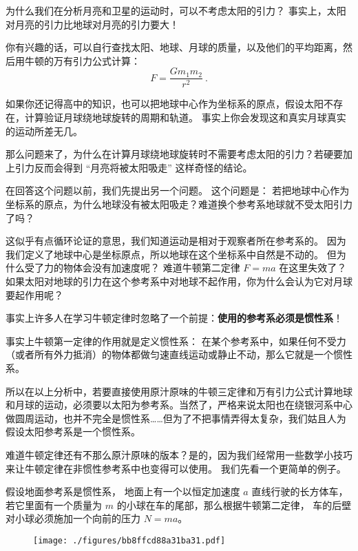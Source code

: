 
为什么我们在分析月亮和卫星的运动时，可以不考虑太阳的引力？ 事实上，太阳对月亮的引力比地球对月亮的引力要大！

你有兴趣的话，可以自行查找太阳、地球、月球的质量，以及他们的平均距离，然后用牛顿的万有引力公式计算：
\begin{equation}
F = \frac{Gm_1m_2}{r^2}~.
\end{equation}

如果你还记得高中的知识，也可以把地球中心作为坐标系的原点，假设太阳不存在，计算验证月球绕地球旋转的周期和轨道。 事实上你会发现这和真实月球真实的运动所差无几。

那么问题来了，为什么在计算月球绕地球旋转时不需要考虑太阳的引力？若硬要加上引力反而会得到 “月亮将被太阳吸走” 这样奇怪的结论。

在回答这个问题以前，我们先提出另一个问题。 这个问题是： 若把地球中心作为坐标系的原点，为什么地球没有被太阳吸走？难道换个参考系地球就不受太阳引力了吗？

这似乎有点循环论证的意思，我们知道运动是相对于观察者所在参考系的。 因为我们定义了地球中心是坐标原点，所以地球在这个坐标系中自然是不动的。 但为什么受了力的物体会没有加速度呢？ 难道牛顿第二定律 $F = ma$ 在这里失效了？ 如果太阳对地球的引力在这个参考系中对地球不起作用，你为什么会认为它对月球要起作用呢？

事实上许多人在学习牛顿定律时忽略了一个前提：\textbf{使用的参考系必须是惯性系}！

事实上牛顿第一定律的作用就是定义惯性系： 在某个参考系中，如果任何不受力（或者所有外力抵消）的物体都做匀速直线运动或静止不动，那么它就是一个惯性系。

所以在以上分析中，若要直接使用原汁原味的牛顿三定律和万有引力公式计算地球和月球的运动，必须要以太阳为参考系。当然了，严格来说太阳也在绕银河系中心做圆周运动，也并不完全是惯性系……但为了不把事情弄得太复杂，我们姑且人为假设太阳参考系是一个惯性系。

难道牛顿定律还有不那么原汁原味的版本？是的，因为我们经常用一些数学小技巧来让牛顿定律在非惯性参考系中也变得可以使用。 我们先看一个更简单的例子。

假设地面参考系是惯性系， 地面上有一个以恒定加速度 $a$ 直线行驶的长方体车， 若它里面有一个质量为 $m$ 的小球在车的尾部，那么根据牛顿第二定律， 车的后壁对小球必须施加一个向前的压力 $N = ma$。

\begin{figure}[ht]
\centering
\texttt{[image: ./figures/bb8ffcd88a31ba31.pdf]}
\caption{} \label{fig_EquivI_1}
\end{figure}

